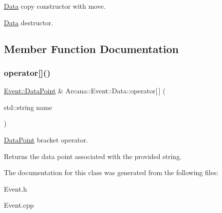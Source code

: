 \mbox{\hyperlink{class_arcana_1_1_event_1_1_data}{Data}} copy constructor with move. 

\mbox{\hyperlink{class_arcana_1_1_event_1_1_data}{Data}} destructor. 

\subsection{Member Function Documentation}
\mbox{\label{class_arcana_1_1_event_1_1_data_ad9fd4aac39a9741d92bb5723b973d3e1}} 
\subsubsection{\texorpdfstring{operator[]()}{operator[]()}}
{\footnotesize\ttfamily \mbox{\hyperlink{struct_arcana_1_1_event_1_1_data_point}{Event\+::\+Data\+Point}} \& Arcana\+::\+Event\+::\+Data\+::operator\mbox{[}$\,$\mbox{]} (\begin{DoxyParamCaption}\item[{std\+::string}]{name }\end{DoxyParamCaption})}



\mbox{\hyperlink{struct_arcana_1_1_event_1_1_data_point}{Data\+Point}} bracket operator. 

Returns the data point associated with the provided string. 

The documentation for this class was generated from the following files\+:\begin{DoxyCompactItemize}
\item 
Event.\+h\item 
Event.\+cpp\end{DoxyCompactItemize}
